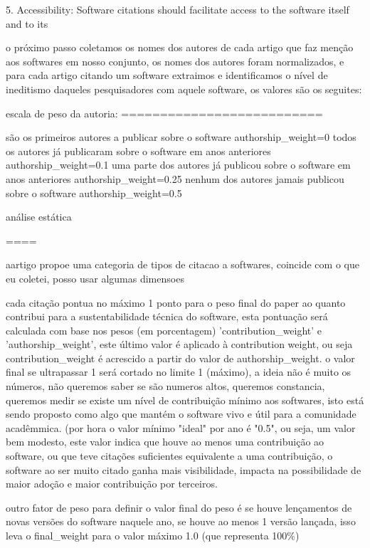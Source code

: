 \cite{smith2016software}

5. Accessibility: Software citations should facilitate access to the software itself and to its


o próximo passo coletamos os nomes dos autores de cada artigo que faz menção
aos softwares em nosso conjunto, os nomes dos autores foram normalizados,
e para cada artigo citando um software extraimos e identificamos o nível
de ineditismo daqueles pesquisadores com aquele software, os valores
são os seguites:

escala de peso da autoria:
==========================

são os primeiros autores a publicar sobre o software
  authorship\_weight=0
todos os autores já publicaram sobre o software em anos anteriores
  authorship\_weight=0.1
uma parte dos autores já publicou sobre o software em anos anteriores
  authorship\_weight=0.25
nenhum dos autores jamais publicou sobre o software
  authorship\_weight=0.5



análise estática


====



aartigo propoe uma categoria de tipos de citacao a softwares,
coincide com o que eu coletei, posso usar algumas dimensoes
\cite{smith2016software}

cada citação pontua no máximo 1 ponto para o peso final do paper ao quanto
contribui para a sustentabilidade técnica do software, esta pontuação será
calculada com base nos pesos (em porcentagem) 'contribution\_weight' e
'authorship\_weight', este último valor é aplicado à contribution weight,
ou seja contribution\_weight é acrescido a partir do valor de authorship\_weight.
o valor final se ultrapassar 1 será cortado no limite 1 (máximo), a ideia não é muito
os números, não queremos saber se são numeros altos, queremos constancia, queremos
medir se existe um nível de contribuição mínimo aos softwares, isto está
sendo proposto como algo que mantém o software vivo e útil para a comunidade
acadêmmica. (por hora o valor mínimo "ideal" por ano é "0.5", ou seja, um
valor bem modesto, este valor indica que houve ao menos uma contribuição
ao software, ou que teve citações suficientes equivalente a uma contribuição,
o software ao ser muito citado ganha mais visibilidade, impacta na possibilidade
de maior adoção e maior contribuição por terceiros.

outro fator de peso para definir o valor final do peso é se houve lençamentos
de novas versões do software naquele ano, se houve ao menos 1 versão lançada,
isso leva o final\_weight para o valor máximo 1.0 (que representa 100\%)

